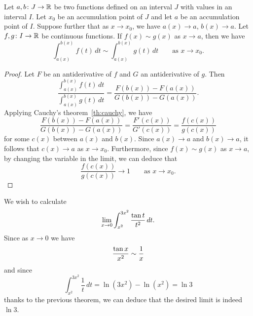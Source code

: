 \begin{theorem}
Let $a,b\colon J \to {\mathbb R}$ be two functions defined on an interval $J$ with
values in an interval $I$. Let $x_0$ be an accumulation point of $J$ and let $a$
be an accumulation point of $I$. Suppose further that as $x\to x_0$, we have
$a(x)\to a$, $b(x)\to a$. Let $f,g\colon I \to {\mathbb R}$ be continuous functions. If
$f(x)\sim g(x)$ as $x\to a$, then we have
\[
  \int_{a(x)}^{b(x)} f(t)\, dt
  \sim \int_{a(x)}^{b(x)} g(t)\, dt
  \qquad \text{as $x\to x_0$}.
\]
\end{theorem}
%
\begin{proof}
Let $F$ be an antiderivative of $f$ and $G$ an antiderivative of $g$. Then
\[
  \frac{\displaystyle\int_{a(x)}^{b(x)}f(t)\, dt}{\displaystyle\int_{a(x)}^{b(x)} g(t)\, dt}
  = \frac{F(b(x)) - F(a(x))}{G(b(x))-G(a(x))}.
\]
Applying Cauchy's theorem~\ref{th:cauchy}, we have
\[
\frac{F(b(x)) - F(a(x))}{G(b(x))-G(a(x))}
= \frac{F'(c(x))}{G'(c(x))}
= \frac{f(c(x))}{g(c(x))}
\]
for some $c(x)$ between $a(x)$ and $b(x)$. Since $a(x)\to a$ and $b(x)\to a$, it
follows that $c(x)\to a$ as $x\to x_0$. Furthermore, since $f(x)\sim g(x)$ as
$x\to a$, by changing the variable in the limit, we can deduce that
\[
\frac{f(c(x))}{g(c(x))} \to 1 \qquad \text{as $x\to x_0$}.
\]
\end{proof}

\begin{example}
We wish to calculate
\[
  \lim_{x\to 0 }\int_{x^2}^{3x^2} \frac{\operatorname{tan} t}{t^2}\, dt.
\]
Since as $x\to 0$ we have
\[
  \frac{\operatorname{tan} x}{x^2} \sim \frac 1 x
\]
and since
\[
  \int_{x^2}^{3x^2}\frac{1}{t}\, dt
  = \ln(3x^2) - \ln(x^2) = \ln 3
\]
thanks to the previous theorem, we can deduce that the desired limit is indeed
$\ln 3$.
\end{example}